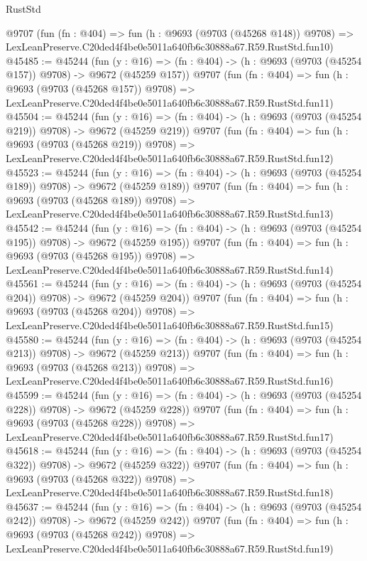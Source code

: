 \begin{lexlean}{RustStd}
\begin{coremodule}
    @9707
    (fun (fn : @404) =>
    fun (h : @9693 (@9703 (@45268 @148)) @9708) =>
    LexLeanPreserve.C20ded4f4be0e5011a640fb6c30888a67.R59.RustStd.fun10)
@45485 := @45244
    (fun (y : @16) => (fn : @404) -> (h : @9693 (@9703 (@45254 @157)) @9708) -> @9672 (@45259 @157))
    @9707
    (fun (fn : @404) =>
    fun (h : @9693 (@9703 (@45268 @157)) @9708) =>
    LexLeanPreserve.C20ded4f4be0e5011a640fb6c30888a67.R59.RustStd.fun11)
@45504 := @45244
    (fun (y : @16) => (fn : @404) -> (h : @9693 (@9703 (@45254 @219)) @9708) -> @9672 (@45259 @219))
    @9707
    (fun (fn : @404) =>
    fun (h : @9693 (@9703 (@45268 @219)) @9708) =>
    LexLeanPreserve.C20ded4f4be0e5011a640fb6c30888a67.R59.RustStd.fun12)
@45523 := @45244
    (fun (y : @16) => (fn : @404) -> (h : @9693 (@9703 (@45254 @189)) @9708) -> @9672 (@45259 @189))
    @9707
    (fun (fn : @404) =>
    fun (h : @9693 (@9703 (@45268 @189)) @9708) =>
    LexLeanPreserve.C20ded4f4be0e5011a640fb6c30888a67.R59.RustStd.fun13)
@45542 := @45244
    (fun (y : @16) => (fn : @404) -> (h : @9693 (@9703 (@45254 @195)) @9708) -> @9672 (@45259 @195))
    @9707
    (fun (fn : @404) =>
    fun (h : @9693 (@9703 (@45268 @195)) @9708) =>
    LexLeanPreserve.C20ded4f4be0e5011a640fb6c30888a67.R59.RustStd.fun14)
@45561 := @45244
    (fun (y : @16) => (fn : @404) -> (h : @9693 (@9703 (@45254 @204)) @9708) -> @9672 (@45259 @204))
    @9707
    (fun (fn : @404) =>
    fun (h : @9693 (@9703 (@45268 @204)) @9708) =>
    LexLeanPreserve.C20ded4f4be0e5011a640fb6c30888a67.R59.RustStd.fun15)
@45580 := @45244
    (fun (y : @16) => (fn : @404) -> (h : @9693 (@9703 (@45254 @213)) @9708) -> @9672 (@45259 @213))
    @9707
    (fun (fn : @404) =>
    fun (h : @9693 (@9703 (@45268 @213)) @9708) =>
    LexLeanPreserve.C20ded4f4be0e5011a640fb6c30888a67.R59.RustStd.fun16)
@45599 := @45244
    (fun (y : @16) => (fn : @404) -> (h : @9693 (@9703 (@45254 @228)) @9708) -> @9672 (@45259 @228))
    @9707
    (fun (fn : @404) =>
    fun (h : @9693 (@9703 (@45268 @228)) @9708) =>
    LexLeanPreserve.C20ded4f4be0e5011a640fb6c30888a67.R59.RustStd.fun17)
@45618 := @45244
    (fun (y : @16) => (fn : @404) -> (h : @9693 (@9703 (@45254 @322)) @9708) -> @9672 (@45259 @322))
    @9707
    (fun (fn : @404) =>
    fun (h : @9693 (@9703 (@45268 @322)) @9708) =>
    LexLeanPreserve.C20ded4f4be0e5011a640fb6c30888a67.R59.RustStd.fun18)
@45637 := @45244
    (fun (y : @16) => (fn : @404) -> (h : @9693 (@9703 (@45254 @242)) @9708) -> @9672 (@45259 @242))
    @9707
    (fun (fn : @404) =>
    fun (h : @9693 (@9703 (@45268 @242)) @9708) =>
    LexLeanPreserve.C20ded4f4be0e5011a640fb6c30888a67.R59.RustStd.fun19)

\end{coremodule}
\end{lexlean}
